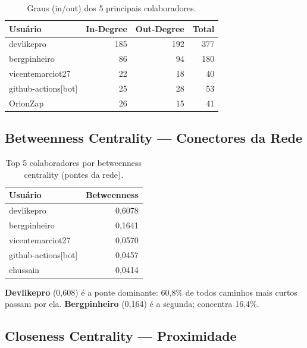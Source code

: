 \documentclass[12pt]{article}
\begin{document}
\begin{table}[H]
  \centering
  \caption{Graus (in/out) dos 5 principais colaboradores.}
  \label{tab:graus}
  \begin{tabular}{l|r|r|r}
    \toprule
    \textbf{Usuário} & \textbf{In-Degree} & \textbf{Out-Degree} & \textbf{Total} \\
    \midrule
    devlikepro           & 185 & 192 & 377 \\
    bergpinheiro         & 86  & 94  & 180 \\
    vicentemarciot27     & 22  & 18  & 40  \\
    github-actions[bot]  & 25  & 28  & 53  \\
    OrionZap             & 26  & 15  & 41  \\
    \bottomrule
  \end{tabular}
\end{table}

\subsection{Betweenness Centrality --- Conectores da Rede}

\begin{table}[H]
  \centering
  \caption{Top 5 colaboradores por betweenness centrality (pontes da rede).}
  \label{tab:betweenness}
  \begin{tabular}{l|r}
    \toprule
    \textbf{Usuário} & \textbf{Betweenness} \\
    \midrule
    devlikepro         & 0,6078 \\
    bergpinheiro       & 0,1641 \\
    vicentemarciot27   & 0,0570 \\
    github-actions[bot] & 0,0457 \\
    ehussain           & 0,0414 \\
    \bottomrule
  \end{tabular}
\end{table}

\textbf{Devlikepro} (0,608) é a ponte dominante: 60,8\% de todos caminhos mais curtos passam por ela. \textbf{Bergpinheiro} (0,164) é a segunda; concentra 16,4\%.

\subsection{Closeness Centrality --- Proximidade}
\end{document}
